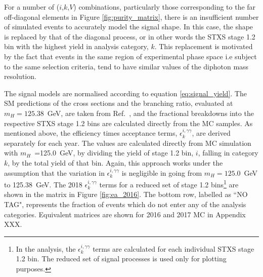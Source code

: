 For a number of ($i$,$k$,$V$) combinations, particularly those corresponding to the far off-diagonal elements in Figure \ref{fig:purity_matrix}, there is an insufficient number of simulated events to accurately model the signal shape. In this case, the shape is replaced by that of the diagonal process, or in other words the STXS stage 1.2 bin with the highest yield in analysis category, $k$. This replacement is motivated by the fact that events in the same region of experimental phase space i.e subject to the same selection criteria, tend to have similar values of the diphoton mass resolution.

The signal models are normalised according to equation \ref{eq:signal_yield}. The SM predictions of the cross sections and the \Hgg branching ratio, evaluated at $m_H=125.38$~GeV, are taken from Ref.~\cite{deFlorian:2016spz}, and the fractional breakdowns into the respective STXS stage 1.2 bins are calculated directly from the MC samples. As mentioned above, the efficiency times acceptance terms, $\epsilon^{i,\gamma\gamma}_{k}$, are derived separately for each year. The values are calculated directly from MC simulation with $m_H$~=125.0~GeV, by dividing the yield of stage 1.2 bin, $i$, falling in category $k$, by the total yield of that bin. Again, this approach works under the assumption that the variation in $\epsilon^{i,\gamma\gamma}_{k}$ is negligible in going from $m_H=125.0$~GeV to 125.38~GeV. The 2018 $\epsilon^{i,\gamma\gamma}_{k}$ terms for a reduced set of stage 1.2 bins\footnote{In the analysis, the $\epsilon^{i,\gamma\gamma}_{k}$ terms are calculated for each individual STXS stage 1.2 bin. The reduced set of signal processes is used only for plotting purposes.} are shown in the matrix in Figure \ref{fig:ea_2016}. The bottom row, labelled as ``NO TAG", represents the fraction of events which do not enter any of the analysis categories. Equivalent matrices are shown for 2016 and 2017 MC in Appendix XXX.

